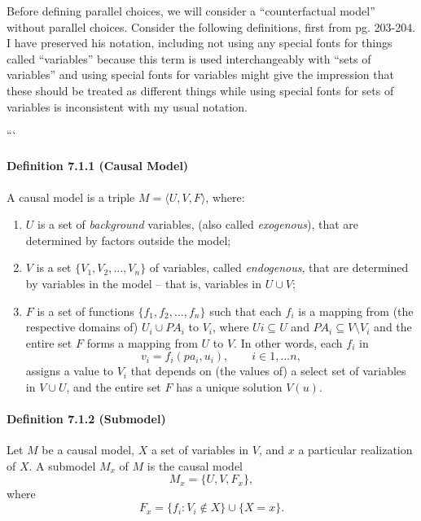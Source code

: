 Before defining parallel choices, we will consider a ``counterfactual model'' without parallel choices. Consider the following definitions, first from \citet{pearl_causality:_2009} pg. 203-204. I have preserved his notation, including not using any special fonts for things called ``variables'' because this term is used interchangeably with ``sets of variables'' and using special fonts for variables might give the impression that these should be treated as different things while using special fonts for sets of variables is inconsistent with my usual notation.


\vspace{1cm}

```
\paragraph{Definition 7.1.1 (Causal Model)}
A causal model is a triple
$M = \langle U, V, F\rangle$,
where:
\begin{enumerate}[label=(\roman*)]
    \item $U$ is a set of \emph{background} variables, (also called \emph{exogenous}), that are determined by factors outside the model;
    \item $V$ is a set $\{V_1 , V_2 ,..., V_n\}$ of variables, called \emph{endogenous}, that are determined by variables in the model -- that is, variables in $U\cup V$;
    \item $F$ is a set of functions $\{f_1 , f_2 ,..., f_n\}$ such that each $f_i$ is a mapping from (the respective domains of) $U_i \cup PA_i$ to $V_i$, where $U i \subseteq U$ and $PA_i \subseteq V \setminus V_i$ and the entire set $F$ forms a mapping from $U$ to $V$. In other words, each $f_i$ in $$v_i = f_i (pa_i , u_i ),\qquad  i\in 1, ... n,$$ assigns a value to $V_i$ that depends on (the values of) a select set of variables in $V \cup U$, and the entire set $F$ has a unique solution $V(u)$.
\end{enumerate}

\paragraph{Definition 7.1.2 (Submodel)}
Let $M$ be a causal model, $X$ a set of variables in $V$, and $x$ a particular realization of $X$. A submodel $M_x$ of $M$ is the causal model $$M_x =\{U, V, F_x\},$$ where $$F_x = \{ f_i : V_i \notin X\}\cup\{ X = x\}.$$

